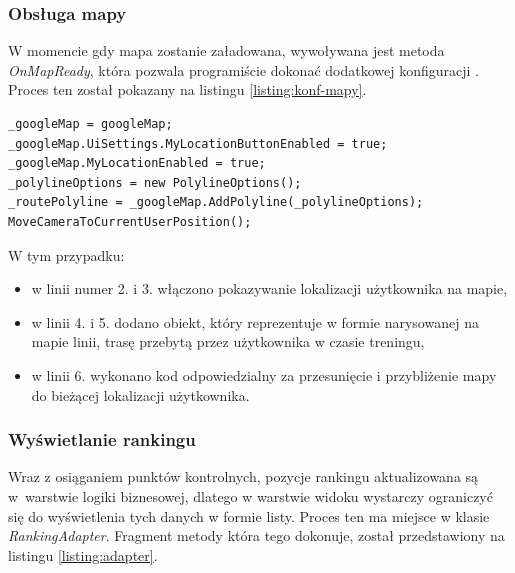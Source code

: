 \subsubsection{Obsługa mapy}
W momencie gdy mapa zostanie załadowana, wywoływana jest metoda \textit{OnMapReady}, która pozwala programiście dokonać dodatkowej konfiguracji \cite{onmapready}. Proces ten został pokazany na listingu \ref{listing:konf-mapy}. 

\begin{lstlisting}[caption={Konfiguracja mapy},label=listing:konf-mapy]
_googleMap = googleMap;
_googleMap.UiSettings.MyLocationButtonEnabled = true;
_googleMap.MyLocationEnabled = true;
_polylineOptions = new PolylineOptions();
_routePolyline = _googleMap.AddPolyline(_polylineOptions);
MoveCameraToCurrentUserPosition();
\end{lstlisting}
W tym przypadku:
\begin{itemize}
\item{w linii numer 2. i 3. włączono pokazywanie lokalizacji użytkownika na mapie},
\item{w linii 4. i 5. dodano obiekt, który reprezentuje w formie narysowanej na mapie linii, trasę przebytą przez użytkownika w czasie treningu},
\item{w linii 6. wykonano kod odpowiedzialny za przesunięcie i przybliżenie mapy do bieżącej lokalizacji użytkownika}.
\end{itemize}
\subsubsection{Wyświetlanie rankingu}
Wraz z osiąganiem punktów kontrolnych, pozycje rankingu aktualizowana są w~warstwie logiki biznesowej, dlatego w warstwie widoku wystarczy ograniczyć się do wyświetlenia tych danych w formie listy. Proces ten ma miejsce w klasie \textit{RankingAdapter}. Fragment metody która tego dokonuje, został przedstawiony na listingu \ref{listing:adapter}.

